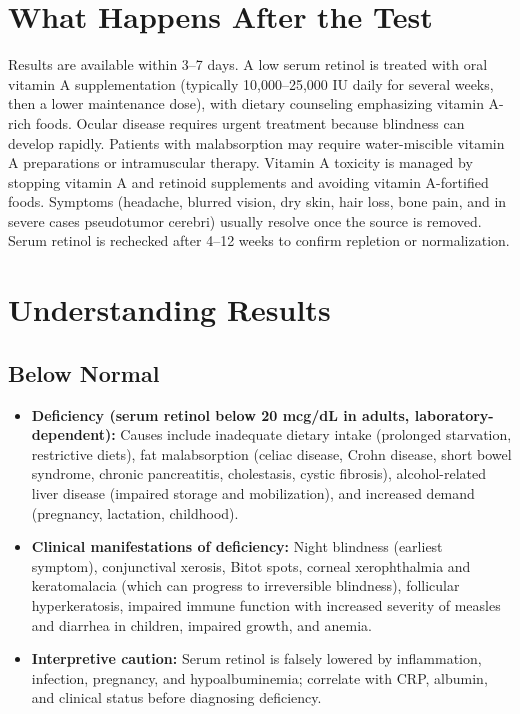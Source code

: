 \section*{What Happens After the Test}
Results are available within 3--7 days. A low serum retinol is treated with oral vitamin A supplementation (typically 10,000--25,000 IU daily for several weeks, then a lower maintenance dose), with dietary counseling emphasizing vitamin A-rich foods. Ocular disease requires urgent treatment because blindness can develop rapidly. Patients with malabsorption may require water-miscible vitamin A preparations or intramuscular therapy. Vitamin A toxicity is managed by stopping vitamin A and retinoid supplements and avoiding vitamin A-fortified foods. Symptoms (headache, blurred vision, dry skin, hair loss, bone pain, and in severe cases pseudotumor cerebri) usually resolve once the source is removed. Serum retinol is rechecked after 4--12 weeks to confirm repletion or normalization.

\section*{Understanding Results}

\subsection*{Below Normal}
\begin{itemize}
  \item \textbf{Deficiency (serum retinol below 20 mcg/dL in adults, laboratory-dependent):} Causes include inadequate dietary intake (prolonged starvation, restrictive diets), fat malabsorption (celiac disease, Crohn disease, short bowel syndrome, chronic pancreatitis, cholestasis, cystic fibrosis), alcohol-related liver disease (impaired storage and mobilization), and increased demand (pregnancy, lactation, childhood).
  \item \textbf{Clinical manifestations of deficiency:} Night blindness (earliest symptom), conjunctival xerosis, Bitot spots, corneal xerophthalmia and keratomalacia (which can progress to irreversible blindness), follicular hyperkeratosis, impaired immune function with increased severity of measles and diarrhea in children, impaired growth, and anemia.
  \item \textbf{Interpretive caution:} Serum retinol is falsely lowered by inflammation, infection, pregnancy, and hypoalbuminemia; correlate with CRP, albumin, and clinical status before diagnosing deficiency.
\end{itemize}

